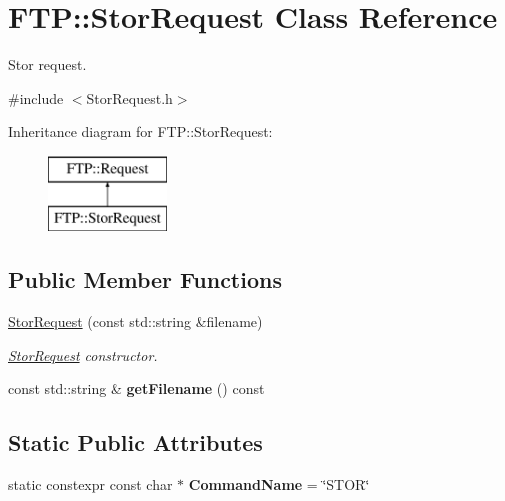 \hypertarget{classFTP_1_1StorRequest}{}\section{F\+T\+P\+:\+:Stor\+Request Class Reference}
\label{classFTP_1_1StorRequest}


Stor request.  




{\ttfamily \#include $<$Stor\+Request.\+h$>$}

Inheritance diagram for F\+T\+P\+:\+:Stor\+Request\+:\begin{figure}[H]
\begin{center}
\leavevmode
\includegraphics[height=2.000000cm]{classFTP_1_1StorRequest}
\end{center}
\end{figure}
\subsection*{Public Member Functions}
\begin{DoxyCompactItemize}
\item 
\hyperlink{classFTP_1_1StorRequest_a264af2e26c14e3523e61806e81d2025a}{Stor\+Request} (const std\+::string \&filename)
\begin{DoxyCompactList}\small\item\em \hyperlink{classFTP_1_1StorRequest}{Stor\+Request} constructor. \end{DoxyCompactList}\item 
\hypertarget{classFTP_1_1StorRequest_a21b00910bb4c7624c069054de1dfa362}{}const std\+::string \& {\bfseries get\+Filename} () const \label{classFTP_1_1StorRequest_a21b00910bb4c7624c069054de1dfa362}

\end{DoxyCompactItemize}
\subsection*{Static Public Attributes}
\begin{DoxyCompactItemize}
\item 
\hypertarget{classFTP_1_1StorRequest_af5bd83c0e967012958f8b4ee2af952b6}{}static constexpr const char $\ast$ {\bfseries Command\+Name} = \char`\"{}S\+T\+O\+R\char`\"{}\label{classFTP_1_1StorRequest_af5bd83c0e967012958f8b4ee2af952b6}

\end{DoxyCompactItemize}



